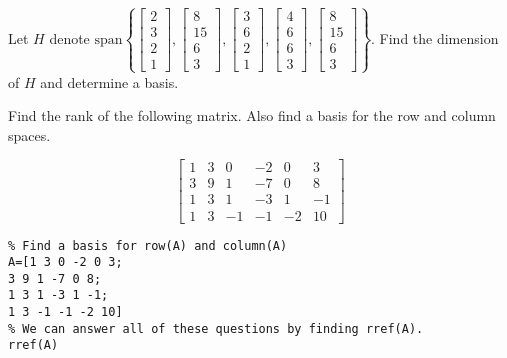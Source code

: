 \documentclass{ximera}
\begin{document}
\begin{problem}\label{prb:5.5} Let $H$ denote $\mbox{span}\left\{ \left[
\begin{array}{r}
2 \\
3 \\
2 \\
1
\end{array}
\right] ,\left[
\begin{array}{r}
8 \\
15 \\
6 \\
3
\end{array}
\right] ,\left[
\begin{array}{r}
3 \\
6 \\
2 \\
1
\end{array}
\right] ,\left[
\begin{array}{r}
4 \\
6 \\
6 \\
3
\end{array}
\right] ,\left[
\begin{array}{r}
8 \\
15 \\
6 \\
3
\end{array}
\right] \right\} .$ Find the dimension of $H$ and determine a basis.

\end{problem}

\begin{problem}\label{prb:5.32} Find the rank of the following matrix. Also find a basis for the row
and column spaces.

\begin{equation*}
\left[
\begin{array}{rrrrrr}
1 & 3 & 0 & -2 & 0 & 3 \\
3 & 9 & 1 & -7 & 0 & 8 \\
1 & 3 & 1 & -3 & 1 & -1 \\
1 & 3 & -1 & -1 & -2 & 10
\end{array}
\right]
\end{equation*}

\begin{hint}
    \begin{verbatim}
% Find a basis for row(A) and column(A)
A=[1 3 0 -2 0 3; 
3 9 1 -7 0 8;
1 3 1 -3 1 -1;
1 3 -1 -1 -2 10]
% We can answer all of these questions by finding rref(A).
rref(A)
\end{verbatim}
\end{hint}
\end{problem}
\end{document}
